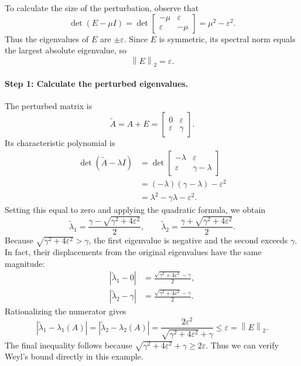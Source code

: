 \documentclass[14pt,letterpaper]{article}
\theoremstyle{plain}
\theoremstyle{definition}
\theoremstyle{remark}
\newcommand{\norm}[1]{\left\lVert #1 \right\rVert}
\begin{document}
To calculate the size of the perturbation, observe that
\[
\det(E-\mu I)
=\det\begin{bmatrix}-\mu&\varepsilon\\
                   \varepsilon&-\mu\end{bmatrix}
=\mu^2-\varepsilon^2.
\]
Thus the eigenvalues of $E$ are $\pm\varepsilon$.
Since $E$ is symmetric, its spectral norm equals the
largest absolute eigenvalue, so
\[
\boxed{\norm{E}_2=\varepsilon.}
\]

\paragraph{Step 1: Calculate the perturbed eigenvalues.}
The perturbed matrix is
\[
\widetilde A=A+E
=\begin{bmatrix}0&\varepsilon\\\varepsilon&\gamma\end{bmatrix}.
\]
Its characteristic polynomial is
\[
\begin{aligned}
\det(\widetilde A-\lambda I)
&=\det\begin{bmatrix}-\lambda&\varepsilon\\
                    \varepsilon&\gamma-\lambda\end{bmatrix}\\
&=(-\lambda)(\gamma-\lambda)-\varepsilon^2\\
&=\lambda^2-\gamma\lambda-\varepsilon^2.
\end{aligned}
\]
Setting this equal to zero and applying the quadratic formula,
we obtain
\[
\boxed{
\widetilde\lambda_1
=\frac{\gamma-\sqrt{\gamma^2+4\varepsilon^2}}{2},
\qquad
\widetilde\lambda_2
=\frac{\gamma+\sqrt{\gamma^2+4\varepsilon^2}}{2}.
}
\]
Because $\sqrt{\gamma^2+4\varepsilon^2}>\gamma$,
the first eigenvalue is negative and the second exceeds $\gamma$.
In fact, their displacements from the original eigenvalues
have the same magnitude:
\[
\begin{aligned}
|\widetilde\lambda_1-0|
&=\frac{\sqrt{\gamma^2+4\varepsilon^2}-\gamma}{2},\\
|\widetilde\lambda_2-\gamma|
&=\frac{\sqrt{\gamma^2+4\varepsilon^2}-\gamma}{2}.
\end{aligned}
\]
Rationalizing the numerator gives
\[
\boxed{
|\widetilde\lambda_1-\lambda_1(A)|
=|\widetilde\lambda_2-\lambda_2(A)|
=\frac{2\varepsilon^2}
{\sqrt{\gamma^2+4\varepsilon^2}+\gamma}
\leq\varepsilon=\norm{E}_2.
}
\]
The final inequality follows because
$\sqrt{\gamma^2+4\varepsilon^2}+\gamma\geq2\varepsilon$.
Thus we can verify Weyl's bound directly in this example.
\end{document}
